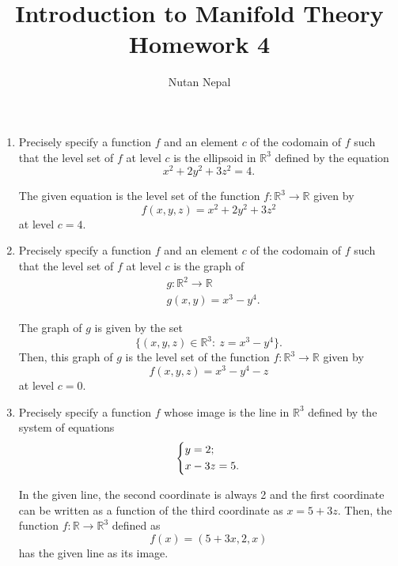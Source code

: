 \documentclass[12pt]{article}
\title{\textbf{Introduction to Manifold Theory} \\
\large Homework 4
}
\author{Nutan Nepal}
\newcommand{\rl}{\mathbb{R}}
\begin{document}
\maketitle
\makebox[\linewidth]{\rule{200mm}{1pt}}
\vspace{1mm}

\begin{enumerate}

\item Precisely specify a function $f$ and an 
element $c$ of the codomain of $f$ such that
the level set of $f$ at
level $c$ is the ellipsoid in
$\rl^3$ defined by the equation
$$x^2+2y^2+3z^2=4.$$

\begin{mybox}

    The given equation is the level set of
    the function $f:\rl^3\to\rl$ given by
    $$f(x,y,z)=x^2+2y^2+3z^2$$
    at level $c=4$.
\end{mybox}


\item Precisely specify a function $f$ and an
element $c$ of the codomain of $f$ such that the
level set of $f$ at
level $c$ is the graph of
\begin{align*}
    &g:\rl^2\to\rl\\
    &g(x,y)=x^3-y^4.
\end{align*}
 
\begin{mybox}

    The graph of $g$ is given by the set
    $$\{(x,y,z)\in\rl^3:\ z=x^3-y^4\}.$$
    Then, this graph of $g$ is the level
    set of the function $f:\rl^3\to\rl$
    given by
    $$f(x,y,z)=x^3-y^4-z$$
    at level $c=0$.
\end{mybox}
 
 
\item Precisely specify a function $f$ whose image
is the line in $\rl^3$ defined by the system
of equations
$$\begin{dcases*}
    y=2;\\
    x-3z=5.
\end{dcases*}
$$

\begin{mybox}

    In the given line, the second coordinate
    is always 2 and the first coordinate can be
    written as a function of the third coordinate
    as $x=5+3z$. Then, the function $f:\rl\to\rl^3$
    defined as
    $$f(x)=(5+3x,2,x)$$ has the given line as
    its image.
\end{mybox}


\end{enumerate}
\end{document}
